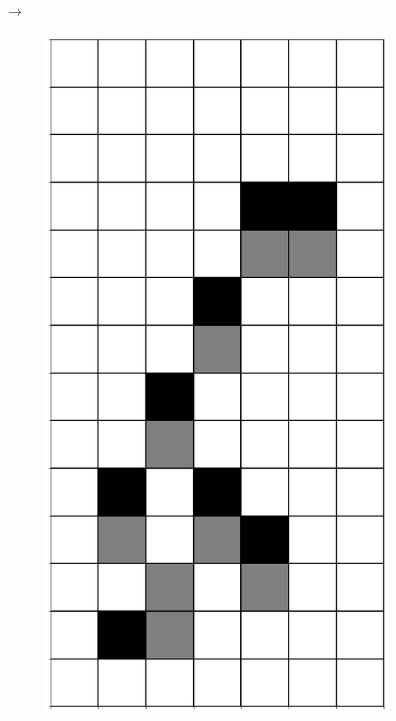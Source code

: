 \documentclass[12pt]{article}
\numberwithin{figure}{section} %
\begin{document}
\begin{figure}[H]
\begin{subfigure}{0.3\textwidth}
     		\subcaption{}
   	\end{subfigure}
     	{\LARGE$\xrightarrow{}$}
      	\newline
   	\setcounter{subfigure}{0}
      	\begin{subfigure}{0.3\textwidth}
     		\centering
     		\includegraphics[angle=270,width=\linewidth]{Section4/12.0}

\end{subfigure}
\end{figure}
\end{document}

